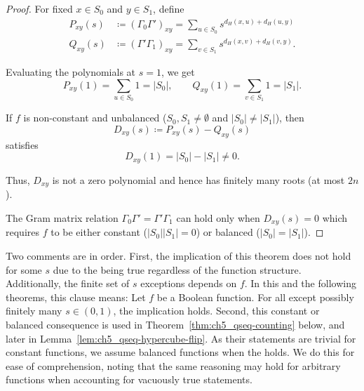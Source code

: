 \begin{proof}
	For fixed $x \in S_0$ and $y \in S_1$, define
	\begin{equation*}
		\begin{aligned}
			P_{xy}(s) &\coloneqq (\Gamma_0 \Gamma')_{xy} = \sum_{u \in S_0} s^{d_H(x, u) + d_H(u, y)} \\
			Q_{xy}(s) &\coloneqq (\Gamma' \Gamma_1)_{xy} = \sum_{v \in S_1} s^{d_H(x, v) + d_H(v, y)}.
		\end{aligned}
	\end{equation*}
	
	Evaluating the polynomials at $s = 1$, we get
	\begin{equation*}
		P_{xy}(1) = \sum_{u \in S_0} 1 = |S_0|, \qquad Q_{xy}(1) = \sum_{v \in S_1} 1 = |S_1|.
	\end{equation*}
	
	If $f$ is non-constant and unbalanced ($S_0, S_1 \neq \emptyset$ and $|S_0| \neq |S_1|$), then
	\begin{equation*}
		D_{xy}(s) \coloneqq P_{xy}(s) - Q_{xy}(s)
	\end{equation*}
	satisfies
	\begin{equation*}
		D_{xy}(1) = |S_0| - |S_1| \neq 0.
	\end{equation*}
	
	Thus, $D_{xy}$ is not a zero polynomial and hence has finitely many roots (at most $2n$).
	
	The Gram matrix relation $\Gamma_0 \Gamma' = \Gamma' \Gamma_1$ can hold only when $D_{xy}(s) = 0$ which requires $f$ to be either constant ($|S_0| |S_1| = 0$) or balanced ($|S_0| = |S_1|$).
\end{proof}

Two comments are in order.
First, the implication of this theorem does not hold for some $s$ due to the \gammacomm{} being true regardless of the function structure.
Additionally, the finite set of $s$ exceptions depends on $f$.
In this and the following theorems, this clause means:
    Let $f$ be a Boolean function.
    For all except possibly finitely many $s \in (0,1)$, the implication holds.
Second, this constant or balanced consequence is used in Theorem~\ref{thm:ch5_qseq-counting} below, and later in Lemma~\ref{lem:ch5_qseq-hypercube-flip}.
As their statements are trivial for constant functions, we assume balanced functions when the \gammacomm{} holds.
We do this for ease of comprehension, noting that the same reasoning may hold for arbitrary functions when accounting for vacuously true statements.

